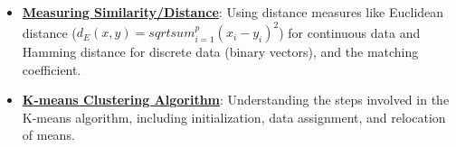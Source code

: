 \documentclass{article}%
\begin{document}
\begin{itemize}[leftmargin=*]
\item \href{https://purdue.brightspace.com/d2l/common/assets/pdfjs-d2l-dist/1.0.14-legacy/web/viewer.html?file=\%2Fcontent\%2Fenforced\%2F1095467-wl.202510.CS.24300.001\%2F12L2-distance-clusters.pdf\%3Fou\%3D1095467\&lang=en-us\&container=d2l-fileviewer-rendered-pdf\&fullscreen=d2l-fileviewer-rendered-pdf-dialog\&height=667#page=17}{\textbf{Measuring Similarity/Distance}}: Using distance measures like Euclidean distance ($d_E(x, y) =  sqrt{ sum_{i=1}^p (x_i - y_i)^2}$) for continuous data and Hamming distance for discrete data (binary vectors), and the matching coefficient.%
\item \href{https://purdue.brightspace.com/d2l/common/assets/pdfjs-d2l-dist/1.0.14-legacy/web/viewer.html?file=\%2Fcontent\%2Fenforced\%2F1095467-wl.202510.CS.24300.001\%2F12L2-distance-clusters.pdf\%3Fou\%3D1095467\&lang=en-us\&container=d2l-fileviewer-rendered-pdf\&fullscreen=d2l-fileviewer-rendered-pdf-dialog\&height=667#page=22}{\textbf{K{-}means Clustering Algorithm}}: Understanding the steps involved in the K-means algorithm, including initialization, data assignment, and relocation of means.%
\end{itemize}%
\end{document}
